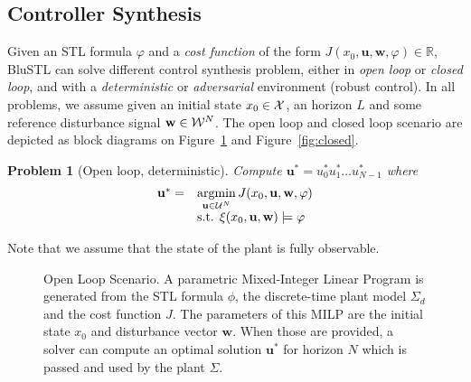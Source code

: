 \documentclass[hyperref, xcolor=dvipsnames, 10pt]{article} %
\DeclareMathOperator*{\argmin}{argmin}
\def \x {\mathbf{x}}
\def \u {\mathbf{u}}
\def \w {\mathbf{w}}
\def \y {\mathbf{y}}
\def \f {\varphi}
\def\X {{\cal X}}
\def\U {{\cal U}}
\def\W {{\cal W}}
\def\Reals {\mathbb{R}}
\newtheorem{problem}{Problem}
\begin{document}
\subsection{Controller Synthesis}

Given an STL formula $\f$ and a \emph{cost function} of the form $J(x_0,\u,\w,\f) \in \Reals$,
BluSTL can solve different control synthesis problem, either in \emph{open loop} or \emph{closed
  loop}, and with a \emph{deterministic} or \emph{adversarial} environment (robust control). In all
problems, we assume given an initial state $x_0 \in \X$, an horizon $L$ and some reference
disturbance signal $\w \in \W^N$. The open loop and closed loop scenario are depicted as block
diagrams on Figure~\ref{fig:open} and Figure~\ref{fig:closed}.

\begin{problem}[Open loop, deterministic]\label{prob:open}
Compute $\u^*=u_0^*u_1^*\hdots u_{N-1}^*$ where
$$
\begin{array}{lll}
\u^*=& \displaystyle \argmin_{\u \in \U^N} J(x_0, \u, \w, \f)\\
&\mbox{s.t. } \xi(x_0, \u, \w) \models \varphi
\end{array}
$$
\end{problem}

Note that we assume that the state of the plant is fully observable.

\begin{figure}[h]
\caption{Open Loop Scenario. A parametric Mixed-Integer Linear Program is generated from the STL
  formula $\phi$, the discrete-time plant model $\Sigma_d$ and the cost function $J$. The parameters
of this MILP are the initial state $x_0$ and disturbance vector $\w$. When those are provided, a
solver can compute an optimal solution $\u^*$ for horizon $N$ which is passed and used by the
plant $\Sigma$.}  
\label{fig:open}
\end{figure}
\end{document}
